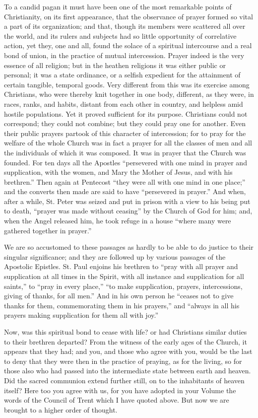To a candid pagan it must have been one of the most remarkable points
of Christianity, on its first appearance, that the observance of prayer
formed so vital a part of its organization; and that, though its members
were scattered all over the world, and its rulers and subjects had so
little opportunity of correlative action, yet they, one and all, found
the solace of a spiritual intercourse and a real bond of union, in the
practice of mutual intercession. Prayer indeed is the very essence of
all religion; but in the heathen religions it was either public or
personal; it was a state ordinance, or a selfish expedient for the
attainment of certain tangible, temporal goods. Very different from this
was its exercise among Christians, who were thereby knit together in one
body, different, as they were, in races, ranks, and habits, distant from
each other in country, and helpless amid hostile populations. Yet it
proved sufficient for its purpose. Christians could not correspond;
they could not combine; but they could pray one for another. Even their
public prayers partook of this character of intercession; for to pray
for the welfare of the whole Church was in fact a prayer for all the
classes of men and all the individuals of which it was composed. It was
in prayer that the Church was founded. For ten days all the Apostles
``persevered with one mind in prayer and supplication, with the
women, and Mary the Mother of Jesus, and with his brethren.'' Then
again at Pentecost ``they were all with one mind in one place;''
and the converts then made are said to have ``persevered in
prayer.'' And when, after a while, St. Peter was seized and put in
prison with a view to his being put to death, ``prayer was made
without ceasing'' by the Church of God for him; and, when the Angel
released him, he took refuge in a house ``where many were gathered
together in prayer.''

We are so accustomed to these passages as hardly to be able to do
justice to their singular significance; and they are followed up by
various passages of the Apostolic Epistles. St. Paul enjoins his
brethren to ``pray with all prayer and supplication at all times in
the Spirit, with all instance and supplication for all saints,'' to
``pray in every place,'' ``to make supplication, prayers,
intercessions, giving of thanks, for all men.'' And in his own
person he ``ceases not to give thanks for them, commemorating them
in his prayers,'' and ``always in all his prayers making
supplication for them all with joy.''

Now, was this spiritual bond to cease with life? or had
Christians similar duties to their brethren departed? From the witness
of the early ages of the Church, it appears that they had; and you, and
those who agree with you, would be the last to deny that they were then
in the practice of praying, as for the living, so for those also who had
passed into the intermediate state between earth and heaven. Did the
sacred communion extend further still, on to the inhabitants of heaven
itself? Here too you agree with us, for you have adopted in your Volume
the words of the Council of Trent which I have quoted above. But now we
are brought to a higher order of thought.

